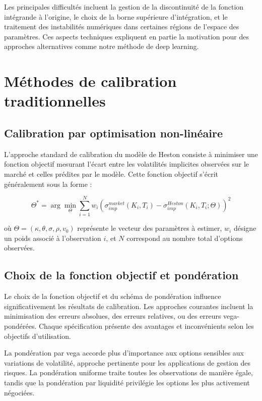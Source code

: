 Les principales difficultés incluent la gestion de la discontinuité de la fonction intégrande à l'origine, le choix de la borne supérieure d'intégration, et le traitement des instabilités numériques dans certaines régions de l'espace des paramètres. Ces aspects techniques expliquent en partie la motivation pour des approches alternatives comme notre méthode de deep learning.

\section{Méthodes de calibration traditionnelles}

\subsection{Calibration par optimisation non-linéaire}

L'approche standard de calibration du modèle de Heston consiste à minimiser une fonction objectif mesurant l'écart entre les volatilités implicites observées sur le marché et celles prédites par le modèle. Cette fonction objectif s'écrit généralement sous la forme :

\begin{equation}
\Theta^* = \arg\min_{\Theta} \sum_{i=1}^{N} w_i \left(\sigma_{imp}^{market}(K_i, T_i) - \sigma_{imp}^{Heston}(K_i, T_i; \Theta)\right)^2
\end{equation}

où $\Theta = (\kappa, \theta, \sigma, \rho, v_0)$ représente le vecteur des paramètres à estimer, $w_i$ désigne un poids associé à l'observation $i$, et $N$ correspond au nombre total d'options observées.

\subsection{Choix de la fonction objectif et pondération}

Le choix de la fonction objectif et du schéma de pondération influence significativement les résultats de calibration. Les approches courantes incluent la minimisation des erreurs absolues, des erreurs relatives, ou des erreurs vega-pondérées. Chaque spécification présente des avantages et inconvénients selon les objectifs d'utilisation.

La pondération par vega accorde plus d'importance aux options sensibles aux variations de volatilité, approche pertinente pour les applications de gestion des risques. La pondération uniforme traite toutes les observations de manière égale, tandis que la pondération par liquidité privilégie les options les plus activement négociées.

